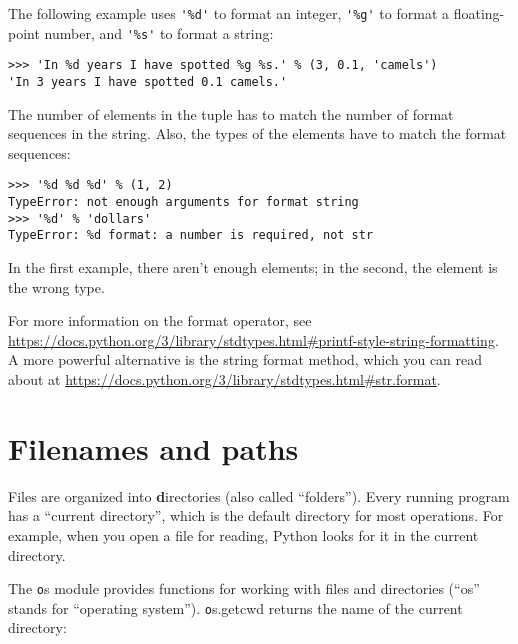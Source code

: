 \documentclass[
DIV=11,
fontsize=12,
twoside,
headinclude=false,
titlepage=firstiscover,
abstract=true,
headsepline=true,
footsepline=true,
chapterprefix=true, %
headings=big,
bibliography=totoc,%
captions=tableheading
]{scrbook}
\theoremstyle{definition}
\begin{document}
The following example uses \verb"'%d'" to format an integer,
\verb"'%g'" to format a floating-point number, and
\verb"'%s'" to format a string:

\begin{lstlisting}
>>> 'In %d years I have spotted %g %s.' % (3, 0.1, 'camels')
'In 3 years I have spotted 0.1 camels.'
\end{lstlisting}
%
The number of elements in the tuple has to match the number
of format sequences in the string.  Also, the types of the
elements have to match the format sequences:

\begin{lstlisting}
>>> '%d %d %d' % (1, 2)
TypeError: not enough arguments for format string
>>> '%d' % 'dollars'
TypeError: %d format: a number is required, not str
\end{lstlisting}
%
In the first example, there aren't enough elements; in the
second, the element is the wrong type.

For more information on the format operator, see
\url{https://docs.python.org/3/library/stdtypes.html#printf-style-string-formatting}.  A more powerful alternative is the string
format method, which you can read about at
\url{https://docs.python.org/3/library/stdtypes.html#str.format}.




\section{Filenames and paths}
\label{paths}

Files are organized into {\textbf directories} (also called ``folders'').
Every running program has a ``current directory'', which is the
default directory for most operations.  
For example, when you open a file for reading, Python looks for it in the
current directory.

The {\texttt os} module provides functions for working with files and
directories (``os'' stands for ``operating system'').  {\texttt os.getcwd}
returns the name of the current directory:
\end{document}
